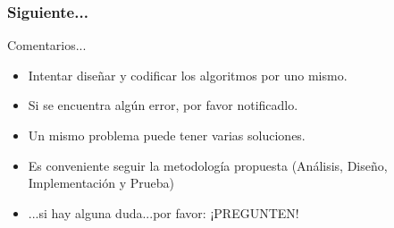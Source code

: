 \documentclass[xcolor=dvipsnames,dvip,notes=show,handout,table]{beamer}
\begin{document}
\begin{frame}[fragile]
\frametitle{Siguiente...}
\begin{exampleblock}{Comentarios...}
\begin{itemize}
 \item Intentar diseñar y codificar los algoritmos por uno mismo.
 \item Si se encuentra algún error, por favor notificadlo.
 \item Un mismo problema puede tener varias soluciones.
 \item Es conveniente seguir la metodología propuesta (Análisis, Diseño, Implementación y Prueba)
 \item ...si hay alguna duda...por favor: ¡PREGUNTEN!
\end{itemize}

\end{exampleblock}



\end{frame}

% 
\frame{
\titlepage

}


\end{document}
